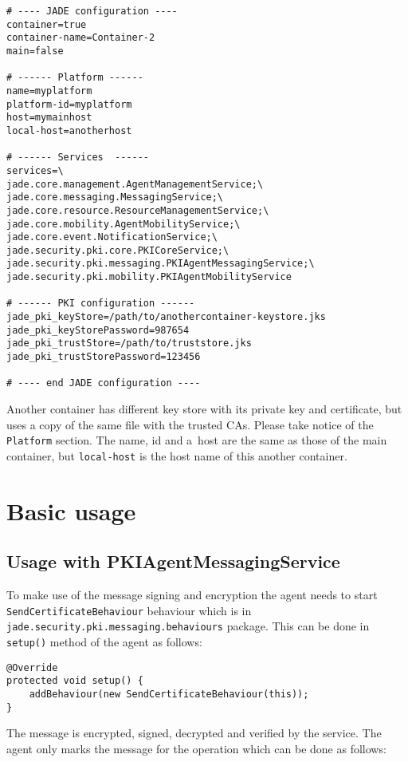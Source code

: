\documentclass[a4paper,11pt]{article}
\begin{document}
\begin{verbatim}
# ---- JADE configuration ----
container=true
container-name=Container-2
main=false

# ------ Platform ------
name=myplatform
platform-id=myplatform
host=mymainhost
local-host=anotherhost

# ------ Services  ------
services=\
jade.core.management.AgentManagementService;\
jade.core.messaging.MessagingService;\
jade.core.resource.ResourceManagementService;\
jade.core.mobility.AgentMobilityService;\
jade.core.event.NotificationService;\
jade.security.pki.core.PKICoreService;\
jade.security.pki.messaging.PKIAgentMessagingService;\
jade.security.pki.mobility.PKIAgentMobilityService

# ------ PKI configuration ------
jade_pki_keyStore=/path/to/anothercontainer-keystore.jks
jade_pki_keyStorePassword=987654
jade_pki_trustStore=/path/to/truststore.jks
jade_pki_trustStorePassword=123456 

# ---- end JADE configuration ----
\end{verbatim}

Another container has different key store with its private key and certificate,
but uses a copy of the same file with the trusted CAs.  Please take notice of
the \texttt{Platform} section.  The name, id and a~host are the same as those
of the main container, but \texttt{local-host} is the host name of this another
container.

\section{Basic usage}

\subsection{Usage with PKI\-Agent\-Messaging\-Ser\-vice}

To make use of the message signing and encryption the agent needs to start
\texttt{Send\-Cer\-ti\-fi\-cate\-Be\-ha\-viour} behaviour which is in
\texttt{jade.\-se\-cu\-ri\-ty.\-pki.\-messaging.\-be\-ha\-viours} package.
This can be done in \texttt{setup()} method of the agent as follows:

\begin{verbatim}
@Override
protected void setup() {
    addBehaviour(new SendCertificateBehaviour(this));
}
\end{verbatim}

The message is encrypted, signed, decrypted and verified by the service.  The
agent only marks the message for the operation which can be done as follows:
\end{document}
